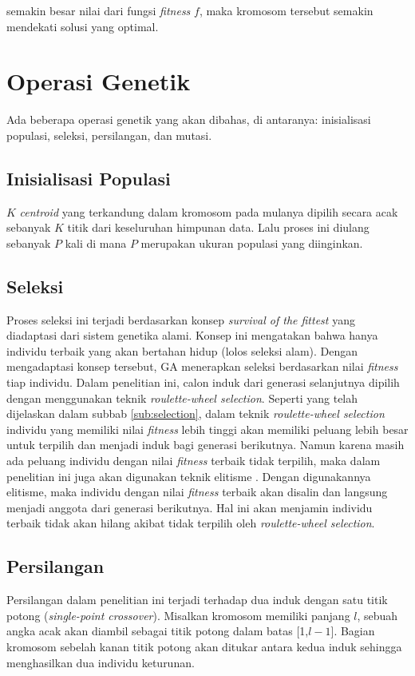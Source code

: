 semakin besar nilai dari fungsi \textit{fitness} $f$, maka kromosom tersebut semakin mendekati solusi yang optimal.

\section{Operasi Genetik}
Ada beberapa operasi genetik yang akan dibahas, di antaranya: inisialisasi populasi, seleksi, persilangan, dan mutasi.

\subsection{Inisialisasi Populasi}
$K$ \textit{centroid} yang terkandung dalam kromosom pada mulanya dipilih secara acak sebanyak $K$ titik dari keseluruhan himpunan data. Lalu proses ini diulang sebanyak $P$ kali di mana $P$ merupakan ukuran populasi yang diinginkan.

\subsection{Seleksi}
Proses seleksi ini terjadi berdasarkan konsep \textit{survival of the fittest} yang diadaptasi dari sistem genetika alami. Konsep ini mengatakan bahwa hanya individu terbaik yang akan bertahan hidup (lolos seleksi alam). Dengan mengadaptasi konsep tersebut, GA menerapkan seleksi berdasarkan nilai \textit{fitness} tiap individu. Dalam penelitian ini, calon induk dari generasi selanjutnya dipilih dengan menggunakan teknik \textit{roulette-wheel selection}. Seperti yang telah dijelaskan dalam subbab \ref{sub:selection}, dalam teknik \textit{roulette-wheel selection} individu yang memiliki nilai \textit{fitness} lebih tinggi akan memiliki peluang lebih besar untuk terpilih dan menjadi induk bagi generasi berikutnya. Namun karena masih ada peluang individu dengan nilai \textit{fitness} terbaik tidak terpilih, maka dalam penelitian ini juga akan digunakan teknik elitisme \cite{ahn2003elitism}. Dengan digunakannya elitisme, maka individu dengan nilai \textit{fitness} terbaik akan disalin dan langsung menjadi anggota dari generasi berikutnya. Hal ini akan menjamin individu terbaik tidak akan hilang akibat tidak terpilih oleh \textit{roulette-wheel selection}.

\subsection{Persilangan}
Persilangan dalam penelitian ini terjadi terhadap dua induk dengan satu titik potong (\textit{single-point crossover}). Misalkan kromosom memiliki panjang $l$, sebuah angka acak akan diambil sebagai titik potong dalam batas [1,$l-1$]. Bagian kromosom sebelah kanan titik potong akan ditukar  antara kedua induk sehingga menghasilkan dua individu keturunan.

